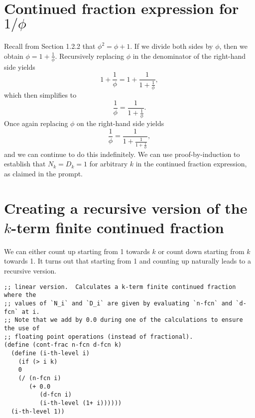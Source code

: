 \documentclass{article}
\begin{document}
\section{Continued fraction expression for $1 / \phi$}

Recall from Section 1.2.2 that $\phi^2 = \phi + 1$.  If we divide both sides by
$\phi$, then we obtain $\phi = 1 + \frac{1}{\phi}$.  Recursively replacing
$\phi$ in the denominator of the right-hand side yields
\begin{equation*}
  1 + \frac{1}{\phi} = 1 + \frac{1}{
    1 + \frac{1}{\phi}},
\end{equation*}
which then simplifies to
\begin{equation*}
  \frac{1}{\phi} = \frac{1}{
    1 + \frac{1}{\phi}}.
\end{equation*}
Once again replacing $\phi$ on the right-hand side yields
\begin{equation*}
  \frac{1}{\phi} = \frac{1}{
    1 + \frac{1}{
      1 + \frac{1}{\phi}}},
\end{equation*}
and we can continue to do this indefinitely.  We can use proof-by-induction to
establish that $N_k = D_k = 1$ for arbitrary $k$ in the continued fraction
expression, as claimed in the prompt.





\section{Creating a recursive version of the $k$-term finite continued fraction}

We can either count up starting from 1 towards $k$ or count down starting from
$k$ towards 1.  It turns out that starting from 1 and counting up naturally
leads to a recursive version.

\begin{lstlisting}[style=scheme]
;; linear version.  Calculates a k-term finite continued fraction where the
;; values of `N_i` and `D_i` are given by evaluating `n-fcn` and `d-fcn` at i.
;; Note that we add by 0.0 during one of the calculations to ensure the use of
;; floating point operations (instead of fractional).
(define (cont-frac n-fcn d-fcn k)
  (define (i-th-level i)
    (if (> i k)
	0
	(/ (n-fcn i)
	   (+ 0.0
	      (d-fcn i)
	      (i-th-level (1+ i))))))
  (i-th-level 1))
\end{lstlisting}
\end{document}
